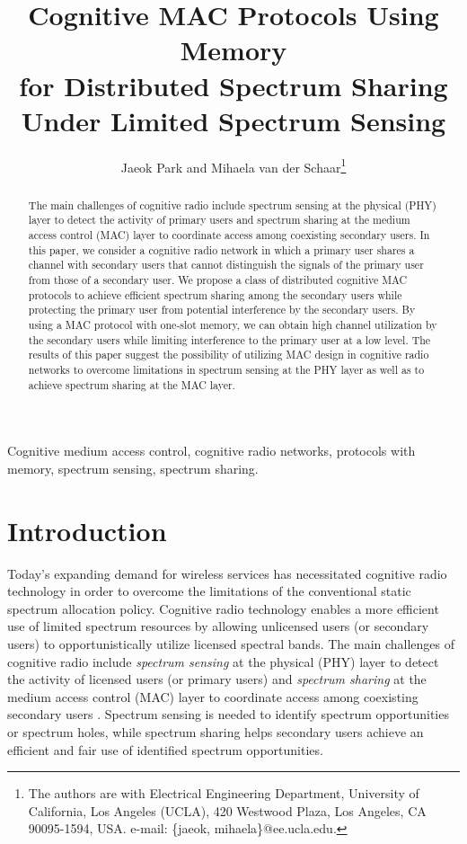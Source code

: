 \documentclass[12pt,draftclsnofoot,onecolumn]{IEEEtran}
\title{Cognitive MAC Protocols Using Memory \\for Distributed Spectrum Sharing \\Under Limited Spectrum Sensing}
\author{Jaeok Park and Mihaela van der Schaar\thanks{The authors are with Electrical Engineering Department, University of
California, Los Angeles (UCLA), 420 Westwood Plaza,
Los Angeles, CA 90095-1594, USA. e-mail: \{jaeok, mihaela\}@ee.ucla.edu.}}
\date{}
\begin{document}
\maketitle

\begin{abstract}

The main challenges of cognitive radio include spectrum sensing at the physical (PHY)
layer to detect the activity of primary users and spectrum
sharing at the medium access control (MAC) layer to coordinate access among
coexisting secondary users.
In this paper, we consider a cognitive radio network in which a primary user shares
a channel with secondary users that cannot distinguish the signals of the primary user
from those of a secondary user.
We propose a class of distributed cognitive MAC protocols to achieve efficient spectrum sharing
among the secondary users while protecting the primary user from potential interference
by the secondary users.
By using a MAC protocol with one-slot memory,
we can obtain high channel utilization by the secondary users while limiting interference to
the primary user at a low level.
The results of this paper suggest the possibility of utilizing MAC design in cognitive radio networks
to overcome limitations in spectrum sensing at the PHY layer as well as to achieve spectrum sharing
at the MAC layer.

\end{abstract}

\begin{IEEEkeywords}
Cognitive medium access control, cognitive radio networks, protocols with memory, spectrum sensing,
spectrum sharing.
\end{IEEEkeywords}

\section{Introduction}

Today's expanding demand for wireless services has necessitated
cognitive radio technology in order to overcome the limitations of the conventional
static spectrum allocation policy. Cognitive radio technology enables a
more efficient use of limited spectrum resources by allowing unlicensed
users (or secondary users) to opportunistically utilize licensed spectral bands.
The main challenges of cognitive radio include \emph{spectrum sensing} at the physical (PHY)
layer to detect the activity of licensed users (or primary users) and \emph{spectrum
sharing} at the medium access control (MAC) layer to coordinate access among
coexisting secondary users \cite{akyildiz}. Spectrum sensing is needed to
identify spectrum opportunities or spectrum holes, while spectrum sharing helps secondary users
achieve an efficient and fair use of identified spectrum opportunities.
\end{document}
